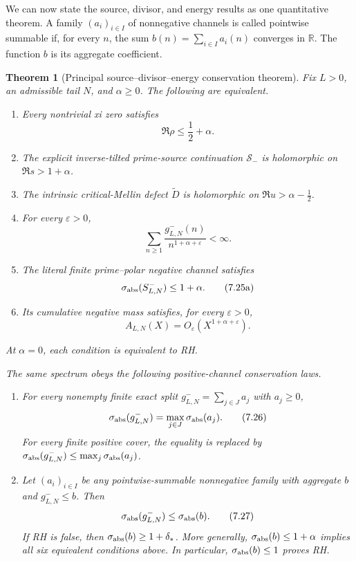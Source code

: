 \documentclass[11pt]{article}
\newtheorem{theorem}{Theorem}[section]
\newcommand{\R}{\mathbb R}
\newcommand{\cS}{\mathcal S}
\begin{document}
We can now state the source, divisor, and energy results as one quantitative theorem.  A family
$(a_i)_{i\in I}$ of nonnegative channels is called pointwise summable if, for every $n$, the sum
$b(n)=\sum_{i\in I}a_i(n)$ converges in $\R$.  The function $b$ is its aggregate coefficient.

\begin{theorem}[Principal source--divisor--energy conservation theorem]
\label{thm:principal-conservation}
Fix $L>0$, an admissible tail $N$, and $\alpha\ge0$.  The following are equivalent.
\begin{enumerate}[label=\textup{(\alph*)}]
\item Every nontrivial xi zero satisfies
\[
 \Re\rho\le\frac12+\alpha.
 \tag{7.24}
\]
\item The explicit inverse-tilted prime-source continuation $\cS_-$ is holomorphic on
$\Re s>1+\alpha$.
\item The intrinsic critical-Mellin defect $\widetilde D$ is holomorphic on
$\Re u>\alpha-\frac12$.
\item For every $\varepsilon>0$,
\[
 \sum_{n\ge1}\frac{g_{L,N}^-(n)}{n^{1+\alpha+\varepsilon}}<\infty.
 \tag{7.25}
\]
\item The literal finite prime--polar negative channel satisfies
\[
 \sigma_{\rm abs}(S_{L,N}^-)\le1+\alpha.
 \tag{7.25a}
\]
\item Its cumulative negative mass satisfies, for every $\varepsilon>0$,
\[
 A_{L,N}(X)=O_\varepsilon(X^{1+\alpha+\varepsilon}).
 \tag{7.25b}
\]
\end{enumerate}
At $\alpha=0$, each condition is equivalent to RH.

The same spectrum obeys the following positive-channel conservation laws.
\begin{enumerate}[label=\textup{(\roman*)}]
\item For every nonempty finite exact split
$g_{L,N}^-=\sum_{j\in J}a_j$ with $a_j\ge0$,
\[
 \sigma_{\rm abs}(g_{L,N}^-)
 =\max_{j\in J}\sigma_{\rm abs}(a_j).
 \tag{7.26}
\]
For every finite positive cover, the equality is replaced by
$\sigma_{\rm abs}(g_{L,N}^-)\le\max_j\sigma_{\rm abs}(a_j)$.

\item Let $(a_i)_{i\in I}$ be any pointwise-summable nonnegative family with aggregate $b$ and
$g_{L,N}^-\le b$.  Then
\[
 \sigma_{\rm abs}(g_{L,N}^-)\le\sigma_{\rm abs}(b).
 \tag{7.27}
\]
If RH is false, then $\sigma_{\rm abs}(b)\ge1+\delta_*$.  More generally,
$\sigma_{\rm abs}(b)\le1+\alpha$ implies all six equivalent conditions above.  In particular,
$\sigma_{\rm abs}(b)\le1$ proves RH.
\end{enumerate}
\end{theorem}
\end{document}
